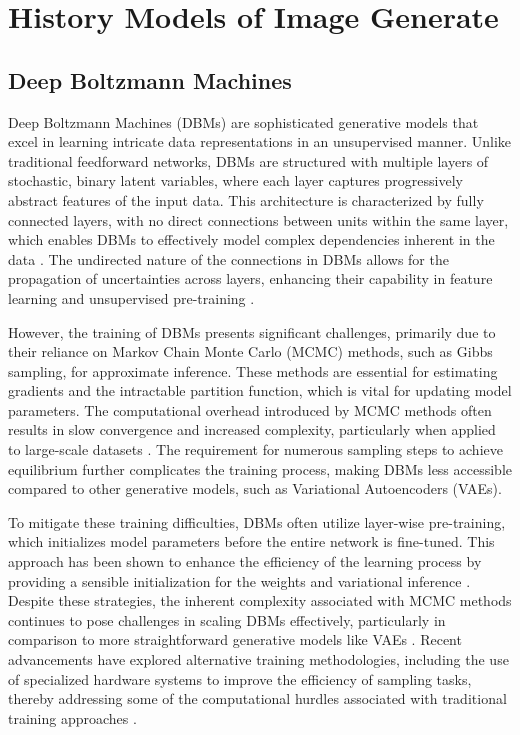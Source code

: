 \chapter{History Models of Image Generate}
\label{Related Work}

\section*{Deep Boltzmann Machines}

Deep Boltzmann Machines (DBMs) are sophisticated generative models that excel in learning intricate data representations 
in an unsupervised manner. Unlike traditional feedforward networks, DBMs are structured with multiple layers of stochastic, 
binary latent variables, where each layer captures progressively abstract features of the input data. This architecture is 
characterized by fully connected layers, with no direct connections between units within the same layer, which enables DBMs 
to effectively model complex dependencies inherent in the data \citep{10.1007/978-3-642-40728-4_14}. The undirected nature 
of the connections in DBMs allows for the propagation of uncertainties across layers, enhancing their capability in feature 
learning and unsupervised pre-training \citep{10.1007/978-3-642-40728-4_14}\citep{10.48550/arxiv.1203.3783}.

However, the training of DBMs presents significant challenges, primarily due to their reliance on Markov Chain Monte Carlo (MCMC) methods, 
such as Gibbs sampling, for approximate inference. These methods are essential for estimating gradients and the intractable partition 
function, which is vital for updating model parameters. The computational overhead introduced by MCMC methods often results in 
slow convergence and increased complexity, particularly when applied to large-scale datasets \citep{10.48550/arxiv.2303.10728}. 
The requirement for numerous sampling steps to achieve equilibrium further complicates the training process, making DBMs less 
accessible compared to other generative models, such as Variational Autoencoders (VAEs).

To mitigate these training difficulties, DBMs often utilize layer-wise pre-training, which initializes model parameters 
before the entire network is fine-tuned. This approach has been shown to enhance the efficiency of the learning process
by providing a sensible initialization for the weights and variational inference \citep{10.1162/neco_a_00311}. Despite 
these strategies, the inherent complexity associated with MCMC methods continues to pose challenges in scaling DBMs 
effectively, particularly in comparison to more straightforward generative models like VAEs \citep{10.48550/arxiv.2303.10728}. 
Recent advancements have explored alternative training methodologies, including the use of specialized hardware systems to improve 
the efficiency of sampling tasks, thereby addressing some of the computational hurdles associated with traditional training approaches \citep{10.48550/arxiv.2303.10728}.



